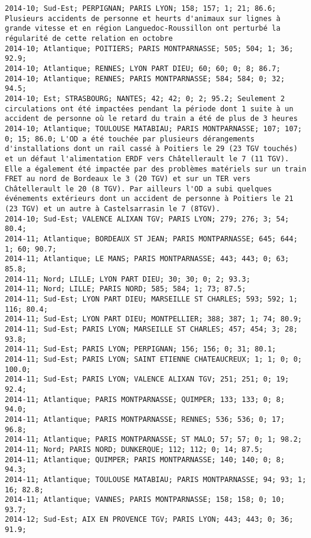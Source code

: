 \documentclass{article}
\begin{document}
\begin{Verbatim}[commandchars=\\\{\}]
2014-10; Sud-Est; PERPIGNAN; PARIS LYON; 158; 157; 1; 21; 86.6; Plusieurs accidents de personne et heurts d'animaux sur lignes à grande vitesse et en région Languedoc-Roussillon ont perturbé la régularité de cette relation en octobre
2014-10; Atlantique; POITIERS; PARIS MONTPARNASSE; 505; 504; 1; 36; 92.9; 
2014-10; Atlantique; RENNES; LYON PART DIEU; 60; 60; 0; 8; 86.7; 
2014-10; Atlantique; RENNES; PARIS MONTPARNASSE; 584; 584; 0; 32; 94.5; 
2014-10; Est; STRASBOURG; NANTES; 42; 42; 0; 2; 95.2; Seulement 2 circulations ont été impactées pendant la période dont 1 suite à un accident de personne où le retard du train a été de plus de 3 heures
2014-10; Atlantique; TOULOUSE MATABIAU; PARIS MONTPARNASSE; 107; 107; 0; 15; 86.0; L'OD a été touchée par plusieurs dérangements d'installations dont un rail cassé à Poitiers le 29 (23 TGV touchés) et un défaut l'alimentation ERDF vers Châtellerault le 7 (11 TGV). Elle a également été impactée par des problèmes matériels sur un train FRET au nord de Bordeaux le 3 (20 TGV) et sur un TER vers Châtellerault le 20 (8 TGV). Par ailleurs l'OD a subi quelques événements extérieurs dont un accident de personne à Poitiers le 21 (23 TGV) et un autre à Castelsarrasin le 7 (8TGV).
2014-10; Sud-Est; VALENCE ALIXAN TGV; PARIS LYON; 279; 276; 3; 54; 80.4; 
2014-11; Atlantique; BORDEAUX ST JEAN; PARIS MONTPARNASSE; 645; 644; 1; 60; 90.7; 
2014-11; Atlantique; LE MANS; PARIS MONTPARNASSE; 443; 443; 0; 63; 85.8; 
2014-11; Nord; LILLE; LYON PART DIEU; 30; 30; 0; 2; 93.3; 
2014-11; Nord; LILLE; PARIS NORD; 585; 584; 1; 73; 87.5; 
2014-11; Sud-Est; LYON PART DIEU; MARSEILLE ST CHARLES; 593; 592; 1; 116; 80.4; 
2014-11; Sud-Est; LYON PART DIEU; MONTPELLIER; 388; 387; 1; 74; 80.9; 
2014-11; Sud-Est; PARIS LYON; MARSEILLE ST CHARLES; 457; 454; 3; 28; 93.8; 
2014-11; Sud-Est; PARIS LYON; PERPIGNAN; 156; 156; 0; 31; 80.1; 
2014-11; Sud-Est; PARIS LYON; SAINT ETIENNE CHATEAUCREUX; 1; 1; 0; 0; 100.0; 
2014-11; Sud-Est; PARIS LYON; VALENCE ALIXAN TGV; 251; 251; 0; 19; 92.4; 
2014-11; Atlantique; PARIS MONTPARNASSE; QUIMPER; 133; 133; 0; 8; 94.0; 
2014-11; Atlantique; PARIS MONTPARNASSE; RENNES; 536; 536; 0; 17; 96.8; 
2014-11; Atlantique; PARIS MONTPARNASSE; ST MALO; 57; 57; 0; 1; 98.2; 
2014-11; Nord; PARIS NORD; DUNKERQUE; 112; 112; 0; 14; 87.5; 
2014-11; Atlantique; QUIMPER; PARIS MONTPARNASSE; 140; 140; 0; 8; 94.3; 
2014-11; Atlantique; TOULOUSE MATABIAU; PARIS MONTPARNASSE; 94; 93; 1; 16; 82.8; 
2014-11; Atlantique; VANNES; PARIS MONTPARNASSE; 158; 158; 0; 10; 93.7; 
2014-12; Sud-Est; AIX EN PROVENCE TGV; PARIS LYON; 443; 443; 0; 36; 91.9; 

\end{Verbatim}
\end{document}
